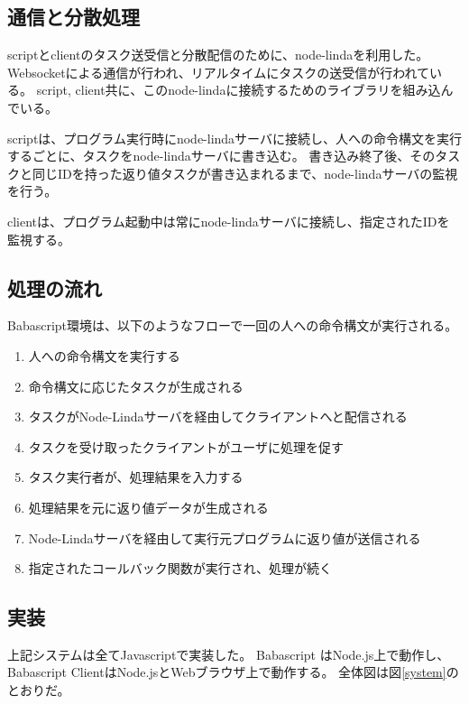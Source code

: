 \subsection{通信と分散処理}\label{ux901aux4fe1ux3068ux5206ux6563ux51e6ux7406}

scriptとclientのタスク送受信と分散配信のために、node-linda\cite{linda}を利用した。
Websocketによる通信が行われ、リアルタイムにタスクの送受信が行われている。
script,
client共に、このnode-lindaに接続するためのライブラリを組み込んでいる。

scriptは、プログラム実行時にnode-lindaサーバに接続し、人への命令構文を実行するごとに、タスクをnode-lindaサーバに書き込む。
書き込み終了後、そのタスクと同じIDを持った返り値タスクが書き込まれるまで、node-lindaサーバの監視を行う。

clientは、プログラム起動中は常にnode-lindaサーバに接続し、指定されたIDを監視する。

\subsection{処理の流れ}\label{ux51e6ux7406ux306eux6d41ux308c}

Babascript環境は、以下のようなフローで一回の人への命令構文が実行される。

\begin{enumerate}
\def\labelenumi{\arabic{enumi}.}
\itemsep1pt\parskip0pt
\item
  人への命令構文を実行する
\item
  命令構文に応じたタスクが生成される
\item
  タスクがNode-Lindaサーバを経由してクライアントへと配信される
\item
  タスクを受け取ったクライアントがユーザに処理を促す
\item
  タスク実行者が、処理結果を入力する
\item
  処理結果を元に返り値データが生成される
\item
  Node-Lindaサーバを経由して実行元プログラムに返り値が送信される
\item
  指定されたコールバック関数が実行され、処理が続く
\end{enumerate}

\subsection{実装}\label{ux5b9fux88c5}

上記システムは全てJavascriptで実装した。 Babascript
はNode.js上で動作し、 Babascript
ClientはNode.jsとWebブラウザ上で動作する。
全体図は図\ref{system}のとおりだ。

